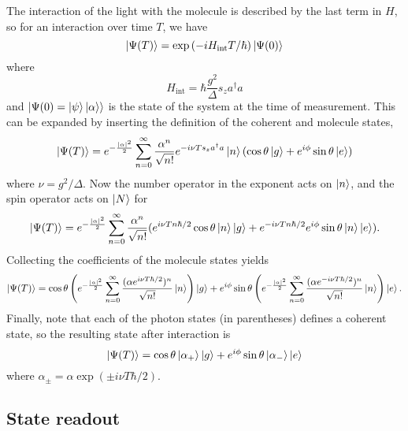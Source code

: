 The interaction of the light with the molecule is described by the last term in
$H$, so for an interaction over time $T$, we have
%
\begin{equation}
  \ket{\Psi(T)} = \exp\left(-iH_\text{int}T/\hbar\right)\ket{\Psi(0)}
\end{equation}
%
where
%
\begin{equation}
  H_\text{int} = \hbar \frac{g^2}{\Delta} s_z a^\dagger a
\end{equation}
%
and $\ket{\Psi(0) = \ket{\psi}\ket{\alpha}}$ is the state of the system at the
time of measurement. This can be expanded by inserting the definition of the
coherent and molecule states,
%
\begin{equation}
  \ket{\Psi(T)} = e^{-\frac{|\alpha|^2}{2}}\sum_{n=0}^\infty
   \frac{\alpha^n}{\sqrt{n!}} e^{-i\nu T s_z a^\dagger a} \ket{n} (\cos\theta
   \ket{g} + e^{i\phi}\sin\theta\ket{e})
   \label{mws:eqn:evolve1}
\end{equation}
%
where $\nu = g^2/\Delta$.
Now the number operator in the exponent acts on $\ket{n}$, and the spin
operator acts on $\ket{N}$ for
%
\begin{equation}
   \ket{\Psi(T)} = e^{-\frac{|\alpha|^2}{2}}\sum_{n=0}^\infty
   \frac{\alpha^n}{\sqrt{n!}} (e^{i\nu T n \hbar/2}\cos\theta\ket{n}\ket{g} +
   e^{-i\nu T n \hbar/2}e^{i\phi}\sin\theta\ket{n}\ket{e}).
\end{equation}
%
Collecting the coefficients of the molecule states yields
%
\begin{equation}
  \ket{\Psi(T)} = \cos\theta\left(e^{-\frac{|\alpha|^2}{2}}\sum_{n=0}^\infty
   \frac{(\alpha e^{i\nu T \hbar/2})^n}{\sqrt{n!}}\ket{n}\right)\ket{g} +  
    e^{i\phi}\sin\theta\left(e^{-\frac{|\alpha|^2}{2}}\sum_{n=0}^\infty
   \frac{(\alpha e^{-i\nu T \hbar/2})^n}{\sqrt{n!}}\ket{n}\right)\ket{e}.
\end{equation}
%
Finally, note that each of the photon states (in parentheses) defines a
coherent state, so the resulting state after interaction is
%
\begin{equation}
  \ket{\Psi(T)} = \cos\theta\ket{\alpha_+}\ket{g} +
  e^{i\phi}\sin\theta\ket{\alpha_-}\ket{e}
  \label{mws:eqn:entangled}
\end{equation}
%
where $\alpha_\pm = \alpha \exp(\pm i \nu T \hbar/2)$.

\subsection{State readout}
\label{mws:readout}

